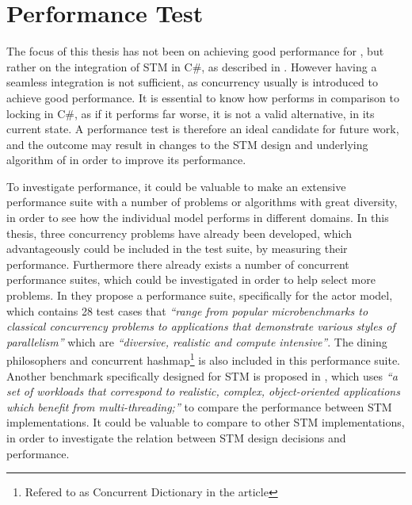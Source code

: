 \makeatletter {}\makeatother
{}
\label{chap:future_work}
\section{Performance Test}
The focus of this thesis has not been on achieving good performance for \stmname, but rather on the integration of \ac{STM} in C\#, as described in . However having a seamless integration is not sufficient, as concurrency usually is introduced to achieve good performance. It is essential to know how \stmname performs in comparison to locking in C\#, as if it performs far worse, it is not a valid alternative, in its current state. A performance test is therefore an ideal candidate for future work, and the outcome may result in changes to the \ac{STM} design and underlying algorithm of \stmname in order to improve its performance.

To investigate performance, it could be valuable to make an extensive performance suite with a number of problems or algorithms with great diversity, in order to see how the individual model performs in different domains. In this thesis, three concurrency problems have already been developed, which advantageously could be included in the test suite, by measuring their performance. Furthermore there already exists a number of concurrent performance suites, which could be investigated in order to help select more problems. In \cite{imam2014savina} they propose a performance suite, specifically for the actor model, which contains 28 test cases that \textit{``range from popular microbenchmarks to classical concurrency problems to applications that demonstrate various styles of parallelism''} which are \textit{``diversive, realistic and compute intensive''}. The dining philosophers and concurrent hashmap\footnote{Refered to as Concurrent Dictionary in the article} is also included in this performance suite. Another benchmark specifically designed for \ac{STM} is proposed in \cite{guerraoui2006stmbench7}, which uses \textit{``a set of workloads that correspond to realistic, complex, object-oriented applications which benefit from multi-threading;''} to compare the performance between \ac{STM} implementations. It could be valuable to compare \stmname to other \ac{STM} implementations, in order to investigate the relation between \ac{STM} design decisions and performance.

